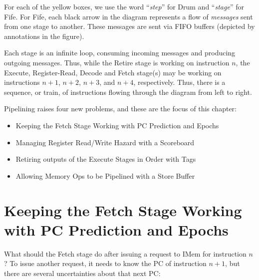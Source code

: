 For each of the yellow boxes, we use the word ``\emph{step}'' for Drum
and ``\emph{stage}'' for Fife.  For Fife, each black arrow in the
diagram represents a flow of \emph{messages} sent from one stage to
another.  These messages are sent via FIFO buffers (depicted by
annotations in the figure).

Each stage is an infinite loop, consuming incoming messages and
producing outgoing messages.  Thus, while the Retire stage is working
on instruction $n$, the Execute, Register-Read, Decode and Fetch
stage(s) may be working on instructions $n+1$, $n+2$, $n+3$, and
$n+4$, respectively.  Thus, there is a sequence, or train, of
instructions flowing through the diagram from left to right.

Pipelining raises four new problems, and these are the focus of this
chapter:

\begin{itemize}

  \item Keeping the Fetch Stage Working with PC Prediction and Epochs

  \item Managing Register Read/Write Hazard with a Scoreboard

  \item Retiring outputs of the Execute Stages in Order with Tags

  \item Allowing Memory Ops to be Pipelined with a Store Buffer

\end{itemize}


\section{Keeping the Fetch Stage Working with PC Prediction and Epochs}

What should the Fetch stage do after issuing a request to IMem for
instruction $n$?  To issue another request, it needs to know the PC of
instruction $n+1$, but there are several uncertainties about that next
PC:

